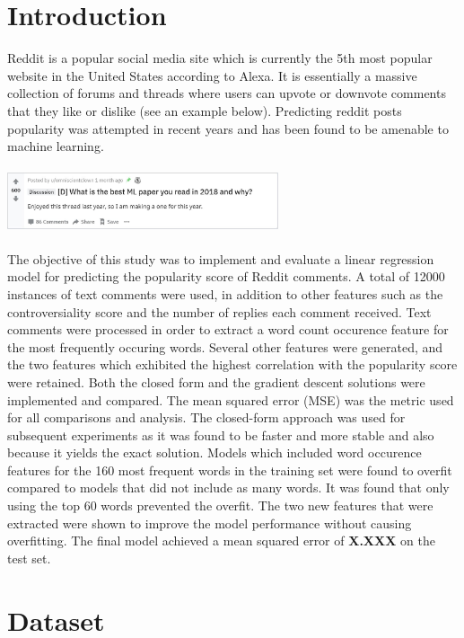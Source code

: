 \documentclass[11pt]{article}
\begin{document}
\section{Introduction}
Reddit is a popular social media site which is currently the 5th most popular website in the United States according to Alexa. It is essentially a massive collection of forums and threads where users can upvote or downvote comments that they like or dislike (see an example below). Predicting reddit posts popularity was attempted in recent years \cite{thesis}\cite{stanford}\cite{TowardsDS} and has been found to be amenable to machine learning. \\
\\
\includegraphics[width=8cm]{reddit}\\
\\
The objective of this study was to implement and evaluate a linear regression model for predicting the popularity score of Reddit comments. A total of 12000 instances of text comments were used, in addition to other features such as the controversiality score and the number of replies each comment received. Text comments were processed in order to extract a word count occurence feature for the most frequently occuring words. Several other features were generated, and the two features which exhibited the highest correlation with the popularity score were retained. Both the closed form and the gradient descent solutions were implemented and compared. The mean squared error (MSE) was the metric used for all comparisons and analysis. The closed-form approach was used for subsequent experiments as it was found to be faster and more stable and also because it yields the exact solution. Models which included word occurence features for the 160 most frequent words in the training set were found to overfit compared to models that did not include as many words. It was found that only using the top 60 words prevented the overfit. The two new features that were extracted were shown to improve the model performance without causing overfitting. The final model achieved a mean squared error of \textbf{X.XXX} on the test set. 


\section{Dataset}
\end{document}
